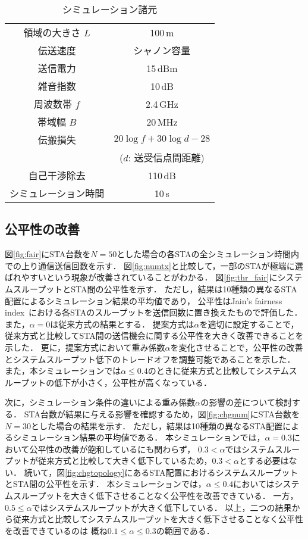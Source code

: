 \documentclass[technicalreport]{ieicej}
\begin{document}
	\begin{table}[t]
		\centering
		\caption{シミュレーション諸元}
		\label{tab:param}
		\begin{tabular}{cc} \hline
			領域の大きさ $L$ & 100\,m \\
			伝送速度 & シャノン容量 \\
			送信電力 & 15\,dBm \\
			雑音指数 & 10\,dB \\
			周波数帯 $f$& 2.4\,GHz \\
			帯域幅 $B$ & 20\,MHz \\
			伝搬損失 & $20\log f+30\log d - 28$\\
			&($d$: 送受信点間距離)\\
			自己干渉除去 & 110\,dB \\
			シミュレーション時間 & 10\,s \\\hline
		\end{tabular}
	\end{table}

	\subsection{公平性の改善}
	図\ref{fig:fair}にSTA台数を$N=50$とした場合の各STAの全シミュレーション時間内での上り通信送信回数を示す．
	図\ref{fig:numtx}と比較して，一部のSTAが極端に選ばれやすいという現象が改善されていることがわかる．
	図\ref{fig:thr_fair}にシステムスループットとSTA間の公平性を示す．
	ただし，結果は10種類の異なるSTA配置によるシミュレーション結果の平均値であり，
	公平性はJain's fairness index~\cite{jain}における各STAのスループットを送信回数に置き換えたもので評価した．
	また，$\alpha=0$は従来方式の結果とする．
	提案方式は$\alpha$を適切に設定することで，従来方式と比較してSTA間の送信機会に関する公平性を大きく改善できることを示した．
	更に，提案方式において重み係数$\alpha$を変化させることで，公平性の改善とシステムスループット低下のトレードオフを調整可能であることを示した．
	また，本シミュレーションでは$\alpha\leq0.4$のときに従来方式と比較してシステムスループットの低下が小さく，公平性が高くなっている．
	\par
	次に，シミュレーション条件の違いによる重み係数$\alpha$の影響の差について検討する．
	STA台数が結果に与える影響を確認するため，図\ref{fig:chgnum}にSTA台数を$N=30$とした場合の結果を示す．
	ただし，結果は10種類の異なるSTA配置によるシミュレーション結果の平均値である．
	本シミュレーションでは，$\alpha=0.3$において公平性の改善が飽和しているにも関わらず，
	$0.3<\alpha$ではシステムスループットが従来方式と比較して大きく低下しているため，$0.3<\alpha$とする必要はない．
	続いて，図\ref{fig:chgtopology}にあるSTA配置におけるシステムスループットとSTA間の公平性を示す．
	本シミュレーションでは，$\alpha\leq0.4$においてはシステムスループットを大きく低下させることなく公平性を改善できている．
	一方，$0.5\leq\alpha$ではシステムスループットが大きく低下している．
	以上，二つの結果から従来方式と比較してシステムスループットを大きく低下させることなく公平性を改善できているのは
	概ね$0.1\leq\alpha\leq0.3$の範囲である．
\end{document}
